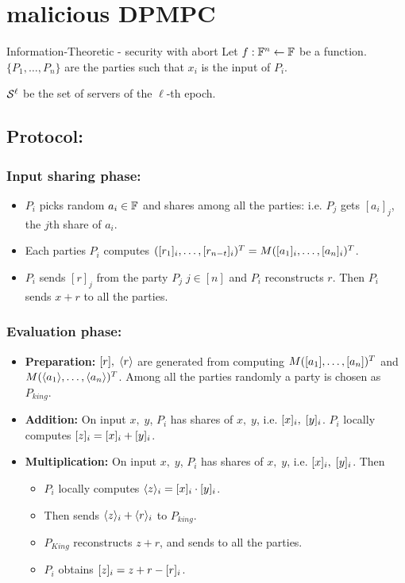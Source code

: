 \section{malicious DPMPC}
Information-Theoretic - security with abort
Let $f:\mathbb{F}^n \leftarrow \mathbb{F}$ be a function. $\{P_1, \ldots, P_n\}$ are the parties such that $x_i$ is the input of $P_i$. 

$\mathcal{S}^{\ell}$ be the set of servers of the $\ell$-th epoch. 
\subsection{Protocol: }
\subsubsection{Input sharing phase: }
\begin{itemize}
	\item $P_i$ picks random $a_i\in \mathbb{F}$ and shares among all the parties: i.e. $P_j$ gets $[a_i]_j$, the $j$th share of $a_i$.
	
	\item Each parties $P_i$ computes 
	$([r_1]_i, \ldots, [r_{n-t}]_i)^T = M([a_1]_i, \ldots, [a_n]_i)^T$.
	
	\item $P_i$ sends $[r]_j$ from the party $P_j \; j\in[n]$ and $P_i$ reconstructs $r$. Then $P_i$ sends $x+r$ to all the parties.
\end{itemize}
\subsubsection{Evaluation phase: }
\begin{itemize}
	\item {\bf Preparation:} $[r],\;\langle r \rangle$ are generated from computing $M([a_1],\ldots, [a_n])^T$ and $M(\langle a_1 \rangle,\ldots, \langle a_n \rangle)^T$. Among all the parties randomly a party is chosen as $P_{king}$.
	
	\item {\bf Addition:} On input $x,\;y$, $P_i$ has shares of $x,\;y$, i.e. $[x]_i,\;[y]_i$. $P_i$  locally computes $[z]_i = [x]_i+[y]_i$.
	
	\item {\bf Multiplication:} On input $x,\;y$, $P_i$ has shares of $x, \;y$, i.e. $[x]_i,\;[y]_i$. Then 
	\begin{itemize}
		\item $P_i$ locally computes $\langle z \rangle_i = [x]_i\cdot [y]_i$. 
		\item Then sends $\langle z \rangle_i +\langle r \rangle_i$ to $P_{king}$.
		\item $P_{King}$ reconstructs $z+r$, and sends to all the parties.
		\item $P_i$ obtains $[z]_i = z+r - [r]_i$.
	\end{itemize}
\end{itemize}


